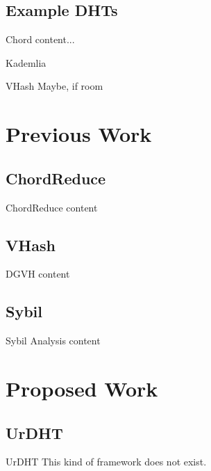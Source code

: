 \documentclass[11pt,aspectratio=169]{beamer}
\begin{document}



\subsection{Example DHTs}

\begin{frame}{Chord}
	content...
\end{frame}

\begin{frame}{Kademlia}
\end{frame}

\begin{frame}{VHash}
	Maybe, if room
\end{frame}
\section{Previous Work}

\subsection{ChordReduce}

\begin{frame}{ChordReduce}
	content
\end{frame}

\subsection{VHash}


\begin{frame}{DGVH}
	content
\end{frame}


\subsection{Sybil}

\begin{frame}{Sybil Analysis}
	content
\end{frame}

\section{Proposed Work}



\subsection{UrDHT}
\begin{frame}{UrDHT}
	This kind of framework does not exist.
\end{frame}
\end{document}
